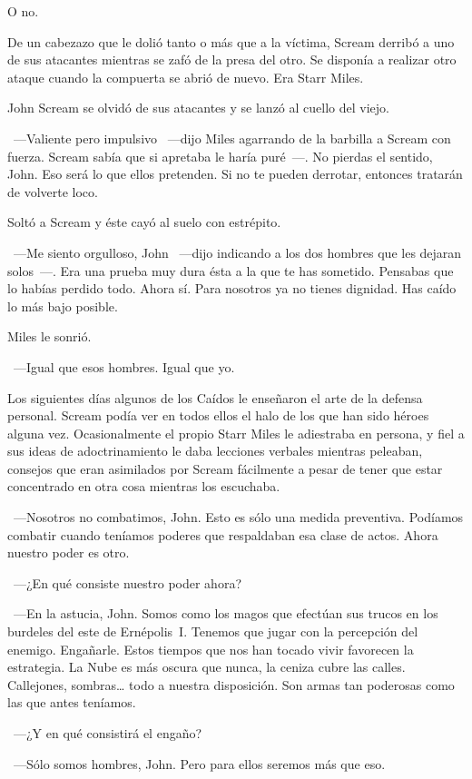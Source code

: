 O no.

De un cabezazo que le dolió tanto o más que a la víctima, Scream derribó a uno de sus atacantes mientras se zafó de la presa del otro. Se disponía a realizar otro ataque cuando la compuerta se abrió de nuevo. Era Starr Miles.

John Scream se olvidó de sus atacantes y se lanzó al cuello del viejo.

~---Valiente pero impulsivo ~---dijo Miles agarrando de la barbilla a Scream con fuerza. Scream sabía que si apretaba le haría puré~---. No pierdas el sentido, John. Eso será lo que ellos pretenden. Si no te pueden derrotar, entonces tratarán de volverte loco.

Soltó a Scream y éste cayó al suelo con estrépito.

~---Me siento orgulloso, John ~---dijo indicando a los dos hombres que les dejaran solos~---. Era una prueba muy dura ésta a la que te has sometido. Pensabas que lo habías perdido todo. Ahora sí. Para nosotros ya no tienes dignidad. Has caído lo más bajo posible.

Miles le sonrió.

~---Igual que esos hombres. Igual que yo.

Los siguientes días algunos de los Caídos le enseñaron el arte de la defensa personal. Scream podía ver en todos ellos el halo de los que han sido héroes alguna vez. Ocasionalmente el propio Starr Miles le adiestraba en persona, y fiel a sus ideas de adoctrinamiento le daba lecciones verbales mientras peleaban, consejos que eran asimilados por Scream fácilmente a pesar de tener que estar concentrado en otra cosa mientras los escuchaba.

~---Nosotros no combatimos, John. Esto es sólo una medida preventiva. Podíamos combatir cuando teníamos poderes que respaldaban esa clase de actos. Ahora nuestro poder es otro.

~---¿En qué consiste nuestro poder ahora?

~---En la astucia, John. Somos como los magos que efectúan sus trucos en los burdeles del este de Ernépolis~I. Tenemos que jugar con la percepción del enemigo. Engañarle. Estos tiempos que nos han tocado vivir favorecen la estrategia. La Nube es más oscura que nunca, la ceniza cubre las calles. Callejones, sombras\dots{} todo a nuestra disposición. Son armas tan poderosas como las que antes teníamos.

~---¿Y en qué consistirá el engaño?

~---Sólo somos hombres, John. Pero para ellos seremos más que eso.

